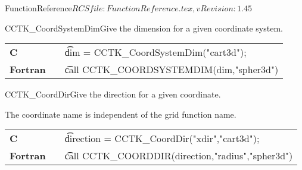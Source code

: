 \begin{cactuspart}{5}{FunctionReference}{$RCSfile: FunctionReference.tex,v $}{$Revision: 1.45 $}
\begin{CCTKFunc}{CCTK\_CoordSystemDim}{Give the dimension for a given coordinate system.}
\label{CCTK-CoordDim}
\showargs
\begin{params}
\end{params}
\begin{discussion}
\end{discussion}
\begin{examples}
\begin{tabular}{@{}p{3cm}cp{11cm}}
\hfill {\bf C} && {\t dim = CCTK\_CoordSystemDim("cart3d")};
\\
\hfill {\bf Fortran} && {\t call  CCTK\_COORDSYSTEMDIM(dim,"spher3d")}
\\
\end{tabular}
\end{examples}
\begin{errorcodes}
\end{errorcodes}
\end{CCTKFunc}


\begin{CCTKFunc}{CCTK\_CoordDir}{Give the direction for a given coordinate.}
\label{CCTK-CoordDir}
\showargs
\begin{params}
\end{params}
\begin{discussion}
The coordinate name is independent of the grid function name.
\end{discussion}
\begin{examples}
\begin{tabular}{@{}p{3cm}cp{11cm}}
\hfill {\bf C} && {\t direction = CCTK\_CoordDir("xdir","cart3d")};
\\
\hfill {\bf Fortran} && {\t call  CCTK\_COORDDIR(direction,"radius","spher3d")}
\\
\end{tabular}
\end{examples}
\begin{errorcodes}
\end{errorcodes}
\end{CCTKFunc}



\end{cactuspart}

